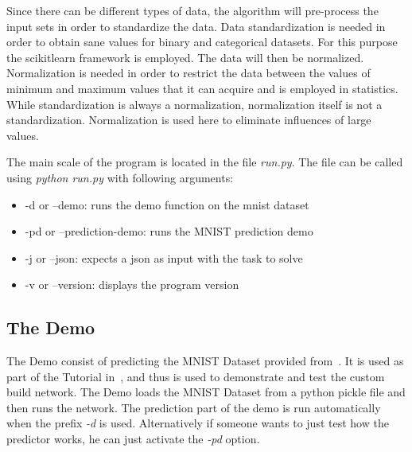 \documentclass{article}
\begin{document}

Since there can be different types of data, the algorithm will pre-process the input sets in order to standardize the data. Data standardization is needed in order to obtain sane values for binary and categorical datasets. For this purpose the scikitlearn framework is employed. The data will then be normalized. Normalization is needed in order to restrict the data between the values of minimum and maximum values that it can acquire and is employed in statistics. While standardization is always a normalization, normalization itself is not a standardization. Normalization is used here to eliminate influences of large values. 

The main scale of the program is located in the file \textit{run.py}. The file can be called using \textit{python run.py} with following arguments:
\begin{itemize}
    \item -d or --demo: runs the demo function on the mnist dataset
    \item -pd or --prediction-demo: runs the MNIST prediction demo 
    \item -j or --json: expects a json as input with the task to solve
    \item -v or --version: displays the program version
\end{itemize}
\subsection{The Demo}
The Demo consist of predicting the MNIST Dataset provided from~\cite{MNISTSite}. It is used as part of the Tutorial in~\cite{deepLearning.org}, and thus is used to demonstrate and test the custom build network. The Demo loads the MNIST Dataset from a python pickle file and then runs the network. The prediction part of the demo is run automatically when the prefix \emph{-d} is used. Alternatively if someone wants to just test how the predictor works, he can just activate the \emph{-pd} option.
\end{document}
